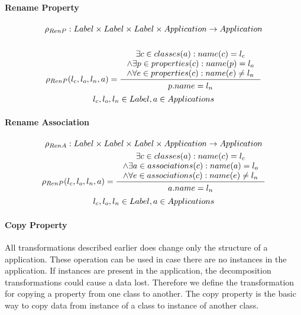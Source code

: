 \documentclass[11pt]{article}
\begin{document}
\paragraph{Rename Property}
\begin{gather*}
\rho_{RenP} : Label \times Label \times Label \times Application \rightarrow Application \\ \\
	\rho_{RenP}(l_c, l_o, l_n, a) = \inference{\exists c \in classes(a) : name(c) = l_c \\ \wedge \exists p \in properties(c) : name(p) = l_o \\ \wedge \forall e \in properties(c) : name(e) \neq l_n}{\begin{gathered}
p.name = l_n 
\end{gathered}}\\
l_c, l_o, l_n \in Label, a \in Applications
\end{gather*}

\paragraph{Rename Association}
\begin{gather*}
\rho_{RenA} : Label \times Label \times Label \times Application \rightarrow Application \\
	\rho_{RenP}(l_c, l_o, l_n, a) = \inference{\exists c \in classes(a) : name(c) = l_c \\ \wedge \exists a \in associations(c) : name(a) = l_o \\ \wedge \forall e \in associations(c) : name(e) \neq l_n}{\begin{gathered}
a.name = l_n 
\end{gathered}}\\
l_c, l_o, l_n \in Label, a \in Applications
\end{gather*}



\paragraph{Copy Property}
All transformations described earlier does change only the structure of a application. These operation can be used in case there are no instances in the application. If instances are present in the application, the decomposition transformations could cause a data lost. Therefore we define  the transformation for copying a property from one class to another. The copy property is the basic way to copy data from instance of a class to instance of another class.
\end{document}
